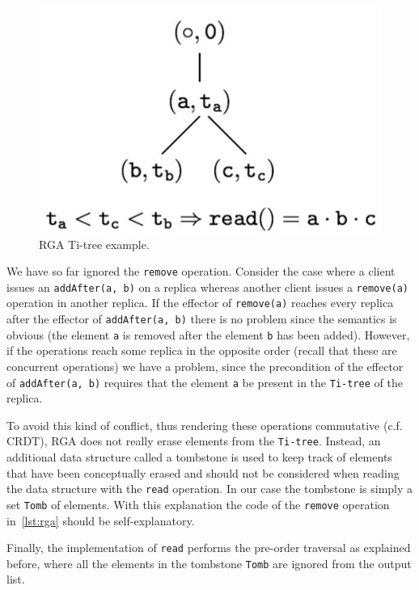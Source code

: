 \begin{figure}[t]
  \centering
  \includegraphics[scale=.25]{figures/simple-ti-tree}
  \caption{RGA Ti-tree example.}
  \label{fig:rga-tree}
\end{figure}


We have so far ignored the \lstinline|remove| operation.
%
Consider the case where a client issues an \lstinline|addAfter(a, b)|
on a replica whereas another client issues a \lstinline|remove(a)|
operation in another replica.
%
If the effector of \lstinline|remove(a)| reaches every replica after
the effector of \lstinline|addAfter(a, b)| there is no problem since
the semantics is obvious (the element \lstinline|a| is removed after
the element \lstinline|b| has been added).
%
However, if the operations reach some replica in the opposite order
(recall that these are concurrent operations) we have a problem, since
the precondition of the effector of \lstinline|addAfter(a, b)|
requires that the element \lstinline|a| be present in the
\lstinline|Ti-tree| of the replica.

To avoid this kind of conflict, thus rendering these operations
commutative (c.f. CRDT), RGA does not really erase elements from the
\lstinline|Ti-tree|.
%
Instead, an additional data structure called a tombstone is used to
keep track of elements that have been conceptually erased and should
not be considered when reading the data structure with the
\lstinline|read| operation.
%
In our case the tombstone is simply a set \lstinline|Tomb| of
elements.
%
With this explanation the code of the \lstinline|remove| operation
in~\autoref{lst:rga} should be self-explanatory.

Finally, the implementation of \lstinline|read| performs the pre-order
traversal as explained before, where all the elements in the tombstone
\lstinline|Tomb| are ignored from the output list.

